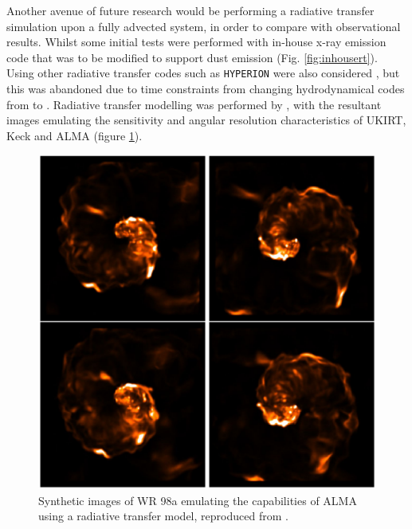 Another avenue of future research would be performing a radiative transfer simulation upon a fully advected system, in order to compare with observational results.
Whilst some initial tests were performed with in-house x-ray emission code that was to be modified to support dust emission (Fig. \ref{fig:inhousert}).
Using other radiative transfer codes such as \texttt{HYPERION} were also considered \parencite{robitailleHYPERIONOpensourceParallelized2011}, but this was abandoned due to time constraints from changing hydrodynamical codes from \mg{} to \athena{}.
Radiative transfer modelling was performed by \textcite{hendrix_pinwheels_2016}, with the resultant images emulating the sensitivity and angular resolution characteristics of UKIRT, Keck and ALMA (figure \ref{fig:hendrix-synthetic}).

\begin{figure}[ht]
  \centering
  \includegraphics{assets/hendrix-synthetic-observation.jpeg}
  \caption[\textit{Radiative transfer images of WR98a \parencite{hendrix_pinwheels_2016}}]{Synthetic images of WR 98a emulating the capabilities of ALMA using a radiative transfer model, reproduced from \textcite{hendrix_pinwheels_2016}.}
  \label{fig:hendrix-synthetic}
\end{figure}
